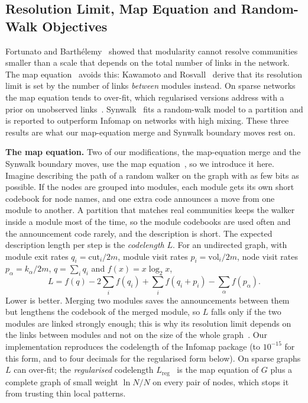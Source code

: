 \documentclass[conference]{IEEEtran}
\begin{document}
\subsection{Resolution Limit, Map Equation and Random-Walk Objectives}
Fortunato and Barth\'elemy~\cite{fortunato2007} showed that modularity cannot resolve communities smaller than a scale that depends on the total number of links in the network. The map equation~\cite{rosvall2008} avoids this: Kawamoto and Rosvall~\cite{kawamoto2015} derive that its resolution limit is set by the number of links \emph{between} modules instead. On sparse networks the map equation tends to over-fit, which regularised versions address with a prior on unobserved links~\cite{smiljanic2020}. Synwalk~\cite{toth2022} fits a random-walk model to a partition and is reported to outperform Infomap on networks with high mixing. These three results are what our map-equation merge and Synwalk boundary moves rest on.

\textbf{The map equation.} Two of our modifications, the map-equation merge and the Synwalk boundary moves, use the map equation~\cite{rosvall2008}, so we introduce it here. Imagine describing the path of a random walker on the graph with as few bits as possible. If the nodes are grouped into modules, each module gets its own short codebook for node names, and one extra code announces a move from one module to another. A partition that matches real communities keeps the walker inside a module most of the time, so the module codebooks are used often and the announcement code rarely, and the description is short. The expected description length per step is the \emph{codelength} $L$. For an undirected graph, with module exit rates $q_i=\mathrm{cut}_i/2m$, module visit rates $p_i=\mathrm{vol}_i/2m$, node visit rates $p_\alpha=k_\alpha/2m$, $q=\sum_iq_i$ and $f(x)=x\log_2x$,
\begin{equation}
L=f(q)-2\sum_if(q_i)+\sum_if(q_i+p_i)-\sum_\alpha f(p_\alpha).\label{eq:L}
\end{equation}
Lower is better. Merging two modules saves the announcements between them but lengthens the codebook of the merged module, so $L$ falls only if the two modules are linked strongly enough; this is why its resolution limit depends on the links between modules and not on the size of the whole graph~\cite{kawamoto2015}. Our implementation reproduces the codelength of the Infomap package (to $10^{-15}$ for this form, and to four decimals for the regularised form below). On sparse graphs $L$ can over-fit; the \emph{regularised} codelength $L_{\mathrm{reg}}$~\cite{smiljanic2020} is the map equation of $G$ plus a complete graph of small weight $\ln N/N$ on every pair of nodes, which stops it from trusting thin local patterns.
\end{document}
